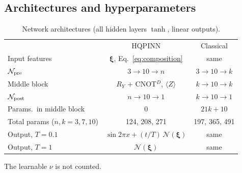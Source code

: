 \documentclass[floatfix,aps,pra,twocolumn,showpacs,superscriptaddress,10pt,nofootinbib]{revtex4-2}
\begin{document}
\begin{appendices}
\section{Architectures and hyperparameters}\label{app:hyper}

\begin{table}[h]
\caption{\justifying Network architectures (all hidden layers $\tanh$, linear outputs).}
\label{tab:arch}
\setlength{\tabcolsep}{3pt}
\footnotesize
\begin{ruledtabular}
\begin{tabular}{lcc}
 & HQPINN & Classical\\
\colrule
Input features & $\bm\xi$, Eq.~\eqref{eq:composition} & same\\
$\mathcal N_{\rm pre}$ & $3\to10\to n$ & $3\to10\to k$ \\
Middle block & $R_Y$ + CNOT$^{D}$, $\langle Z\rangle$ & $k\to10\to k$ \\
$\mathcal N_{\rm post}$ & $n\to10\to1$ & $k\to10\to1$ \\
Params.\ in middle block & 0 & $21k+10$ \\
Total params ($n,k=3,7,10$) & 124, 208, 271 & 197, 365, 491 \\
Output, $T=0.1$ & $\sin2\pi x+(t/T)\,\mathcal N(\bm\xi)$ & same\\
Output, $T=1$ & $\mathcal N(\bm\xi)$ & same\\
\end{tabular}
\end{ruledtabular}
\raggedright\footnotesize The learnable $\nu$ is not counted.
\end{table}


\end{appendices}
\end{document}
